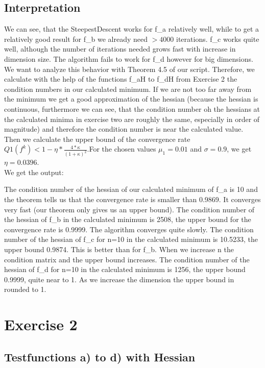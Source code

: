 \documentclass{article}
\begin{document}
	\subsection{Interpretation}
	We can see, that the SteepestDescent works for f\_a relatively well, while to get a relatively good result for f\_b we already need $>4000$ iterations.
	f\_c works quite well, although the number of iterations needed grows fast with increase in dimension size. The algorithm fails to work for f\_d however for big dimensions.\\
    We want to analyze this behavior with Theorem 4.5 of our script. Therefore, we calculate with the help of the functions f\_aH to f\_dH from Exercise 2 the condition numbers in our calculated minimum. If we are not too far away from the minimum we get a good approximation of the hessian (because the hessian is continuous, furthermore we can see, that the condition number oh the hessians at the calculated minima in exercise two are roughly the same, especially in order of magnitude) and therefore the condition number is near the calculated value.
     Then we calculate the upper bound of the convergence rate $Q1(f^k)<1-\eta*\frac{4*\kappa}{(1+\kappa)^2}$.For the chosen values $\mu_1= 0.01$ and $\sigma=0.9$, we get $\eta=0.0396$.\\
     We get the output: 
    
    The condition number of the hessian of our calculated minimum of f\_a is 10 and the theorem tells us that the convergence rate is smaller than 0.9869. It converges very fast (our theorem only gives us an upper bound). The condition number of the hessian of f\_b in the calculated minimum is 2508, the upper bound for the convergence rate is 0.9999. The algorithm converges quite slowly. The condition number of the hessian of f\_c for n=10 in the calculated minimum is 10.5233, the upper bound 0.9874. This is better than for f\_b. When we increase n the condition matrix and the upper bound increases. The condition number of the hessian of f\_d for n=10 in the calculated minimum is 1256, the upper bound 0.9999, quite near to 1. As we increase the dimension the upper bound in rounded to 1.
	
	\section{Exercise 2}
	\subsection{Testfunctions a) to d) with Hessian}
	
	
	
	
	
\end{document}
